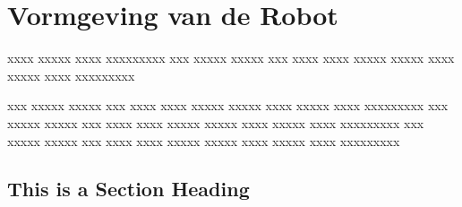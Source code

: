  
\chapter{Vormgeving van de Robot}
 
xxxx xxxxx xxxx xxxxxxxxx 
xxx xxxxx xxxxx xxx xxxx xxxx xxxxx xxxxx xxxx xxxxx xxxx xxxxxxxxx
 
 
xxx xxxxx xxxxx xxx xxxx xxxx xxxxx xxxxx xxxx xxxxx xxxx xxxxxxxxx
xxx xxxxx xxxxx xxx xxxx xxxx xxxxx xxxxx xxxx xxxxx xxxx xxxxxxxxx
xxx xxxxx xxxxx xxx xxxx xxxx xxxxx xxxxx xxxx xxxxx xxxx xxxxxxxxx
 
 
 
\section{This is a Section Heading}
 